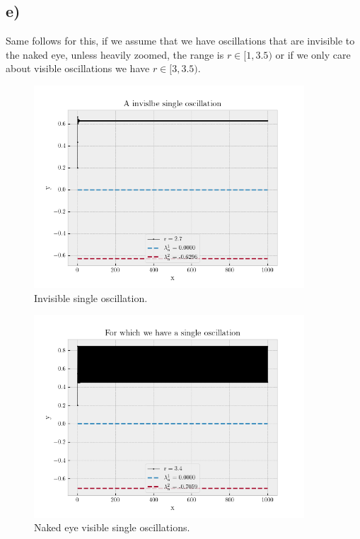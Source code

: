 \documentclass[10pt, a4paper]{amsart}
\begin{document}
\subsection{e)}
Same follows for this, if we assume that we have oscillations that are invisible to the naked eye, unless heavily zoomed, the range is $r\in[1,3.5)$ or if we only care about  visible oscillations we have $r\in[3,3.5)$. 
\begin{figure}
	\centering
	\includegraphics[width=0.9\textwidth]{../code/e1.png}

	\caption{Invisible single oscillation.}
		\label{fig:2}
\end{figure}
\begin{figure}
	\centering
	\includegraphics[width=0.9\textwidth]{../code/e2.png}

	\caption{Naked eye visible single oscillations.}
		\label{fig:3}
\end{figure}
\end{document}
